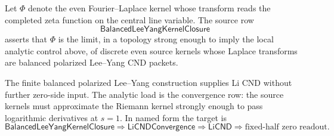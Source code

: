 \begin{definition}
\label{def:rh-balanced-lee-yang-kernel-closure}
Let $\Phi$ denote the even Fourier--Laplace kernel whose transform reads
the completed zeta function on the central line variable.  The source row
$$
\mathsf{BalancedLeeYangKernelClosure}
$$
asserts that $\Phi$ is the limit, in a topology strong enough to imply
the local analytic control above, of discrete even source kernels whose
Laplace transforms are balanced polarized Lee--Yang CND packets.
\end{definition}

\begin{principle}
\label{prin:rh-kernel-closure-cnd-convergence-load}
The finite balanced polarized Lee--Yang construction supplies Li CND
without further zero-side input.  The analytic load is the convergence
row: the source kernels must approximate the Riemann kernel strongly
enough to pass logarithmic derivatives at $s=1$.  In named form the
target is
$$
\mathsf{BalancedLeeYangKernelClosure}
\Longrightarrow
\mathsf{LiCNDConvergence}
\Longrightarrow
\mathsf{LiCND}
\Longrightarrow
\text{fixed-half zero readout}.
$$
\end{principle}

